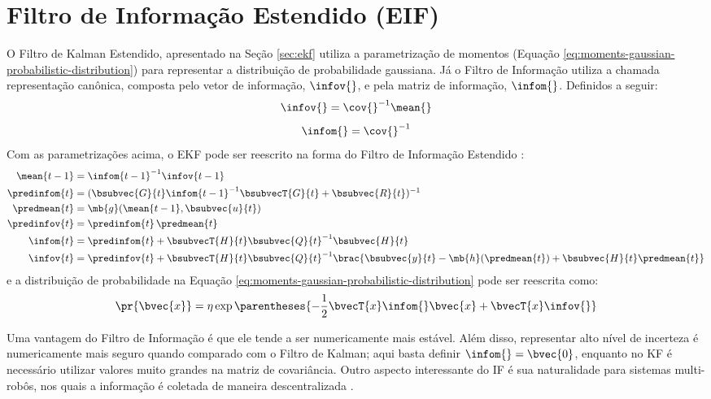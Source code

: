 \section{Filtro de Informação Estendido (EIF)}
O Filtro de Kalman Estendido, apresentado na Seção \ref{sec:ekf} utiliza a
parametrização de momentos (Equação \ref{eq:moments-gaussian-probabilistic-distribution}) para representar a 
distribuição de probabilidade 
gaussiana. Já o Filtro de Informação utiliza a chamada representação canônica, composta pelo vetor de informação, $\infov{}$, e pela matriz de informação, $\infom{}$. Definidos a seguir:
\newcommand{\ifcorrespondence}{\infov{} = \cov{}^{-1} \mean{}}
\begin{equation}
  \ifcorrespondence 
  \label{eq:info-vector}
\end{equation}
\begin{equation}
  \infom{} = \cov{}^{-1}
  \label{eq:info-matrix}
\end{equation}
Com as parametrizações acima, o EKF pode ser reescrito na forma do Filtro de 
Informação Estendido \cite[p.~76]{thrun2005probabilistic}:
\begin{align}
  \mean{t-1} &= \infom{t-1}^{-1} \infov{t-1}
  \label{eq:eif-mean-recuperation} \\
  \predinfom{t} &= (\bsubvec{G}{t} \infom{t-1}^{-1} \bsubvecT{G}{t} + \bsubvec{R}{t})^{-1}
  \label{eq:eif-info-matrix-prediction}\\
  \predmean{t} &= \mb{g}(\mean{t-1}, \bsubvec{u}{t})
  \label{eq:eif-mean-prediction} \\
  \predinfov{t} &= \predinfom{t}\,\predmean{t}
  \label{eq:eif-info-vector-prediction} \\
  \infom{t} &= \predinfom{t} + \bsubvecT{H}{t} \bsubvec{Q}{t}^{-1} \bsubvec{H}{t}
  \label{eq:eif-info-matrix-update} \\
  \infov{t} &= \predinfov{t} + \bsubvecT{H}{t}\bsubvec{Q}{t}^{-1} 
  \brac{\bsubvec{y}{t} - \mb{h}(\predmean{t}) + \bsubvec{H}{t}\predmean{t}}
  \label{eq:eif-info-vector-update}
\end{align}
e a distribuição de probabilidade na Equação \ref{eq:moments-gaussian-probabilistic-distribution} pode ser reescrita como:
\begin{equation}
  \pr{\bvec{x}} = \eta \exp\parentheses{-\frac{1}{2} 
  \bvecT{x} \infom{} \bvec{x} + \bvecT{x}\infov{}}
  \label{eq:canonical-gaussian-probabilistic-distribution}
\end{equation}

Uma vantagem do Filtro de Informação é que ele tende a ser numericamente mais estável. Além disso, 
representar alto nível de incerteza é numericamente mais seguro quando comparado 
com o Filtro de Kalman; aqui basta definir $\infom{} = \bvec{0}$, enquanto no KF 
é necessário utilizar valores muito grandes na matriz de covariância. Outro 
aspecto interessante do IF é sua naturalidade para sistemas multi-robôs, nos quais a 
informação é coletada de maneira descentralizada \cite[p.~78]{thrun2005probabilistic}.

